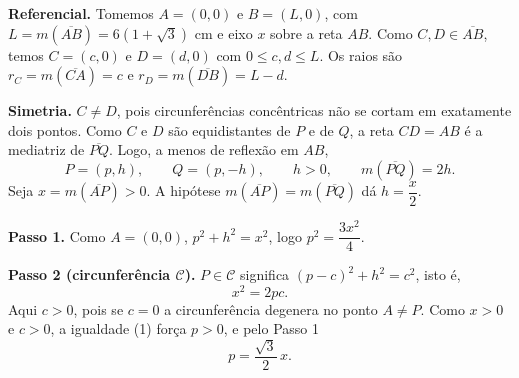 \documentclass{article}%
\begin{document}
\begin{center}
\end{center}

\textbf{Referencial.} Tomemos $A=(0,0)$ e $B=(L,0)$, com $L=m(\overline{AB})=6(1+\sqrt{3})$ cm e eixo $x$ sobre a reta $AB$. Como $C,D\in\overline{AB}$, temos $C=(c,0)$ e $D=(d,0)$ com $0\le c,d\le L$. Os raios são $r_C=m(\overline{CA})=c$ e $r_D=m(\overline{DB})=L-d$.

\textbf{Simetria.} $C\neq D$, pois circunferências concêntricas não se cortam em exatamente dois pontos. Como $C$ e $D$ são equidistantes de $P$ e de $Q$, a reta $CD=AB$ é a mediatriz de $\overline{PQ}$. Logo, a menos de reflexão em $AB$,
$$P=(p,h),\qquad Q=(p,-h),\qquad h>0,\qquad m(\overline{PQ})=2h.$$
Seja $x=m(\overline{AP})>0$. A hipótese $m(\overline{AP})=m(\overline{PQ})$ dá $h=\dfrac{x}{2}$.

\textbf{Passo 1.} Como $A=(0,0)$, $p^2+h^2=x^2$, logo $p^2=\dfrac{3x^2}{4}$.

\textbf{Passo 2 (circunferência $\mathcal{C}$).} $P\in\mathcal{C}$ significa $(p-c)^2+h^2=c^2$, isto é,
\begin{equation}
x^2=2pc.
\end{equation}
Aqui $c>0$, pois se $c=0$ a circunferência degenera no ponto $A\neq P$. Como $x>0$ e $c>0$, a igualdade (1) força $p>0$, e pelo Passo 1
\begin{equation}
p=\frac{\sqrt{3}}{2}\,x.
\end{equation}
\end{document}
